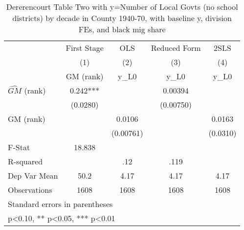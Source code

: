 \begin{table}[htbp]\centering
\def\sym#1{\ifmmode^{#1}\else\(^{#1}\)\fi}
\caption{Dererencourt Table Two with y=Number of Local Govts (no school districts) by decade in County 1940-70, with baseline y, division FEs, and black mig share}
\begin{tabular}{l*{4}{c}}
\toprule
                    & First Stage   &         OLS   &Reduced Form   &        2SLS   \\
                    &\multicolumn{1}{c}{(1)}&\multicolumn{1}{c}{(2)}&\multicolumn{1}{c}{(3)}&\multicolumn{1}{c}{(4)}\\
                    &\multicolumn{1}{c}{GM  (rank)}&\multicolumn{1}{c}{y\_L0}&\multicolumn{1}{c}{y\_L0}&\multicolumn{1}{c}{y\_L0}\\
\midrule
$\hat{GM}$ (rank)   &       0.242***&               &     0.00394   &               \\
                    &    (0.0280)   &               &   (0.00750)   &               \\
\addlinespace
GM  (rank)          &               &      0.0106   &               &      0.0163   \\
                    &               &   (0.00761)   &               &    (0.0310)   \\
\midrule
F-Stat              &      18.838   &               &               &               \\
R-squared           &               &         .12   &        .119   &               \\
Dep Var Mean        &        50.2   &        4.17   &        4.17   &        4.17   \\
Observations        &        1608   &        1608   &        1608   &        1608   \\
\bottomrule
\multicolumn{5}{l}{\footnotesize Standard errors in parentheses}\\
\multicolumn{5}{l}{\footnotesize * p<0.10, ** p<0.05, *** p<0.01}\\
\end{tabular}
\end{table}
